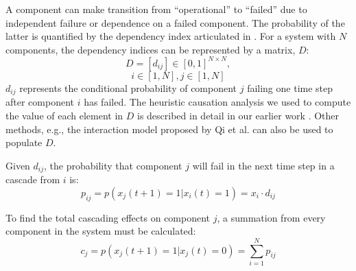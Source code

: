 \documentclass[runningheads]{llncs}
\begin{document}
A component can make transition from ``operational''  to  ``failed'' due to independent failure or dependence on a failed component. The probability of the latter is quantified by the dependency index articulated in \cite{marashi_identification_2021}. For a system with $N$ components, the dependency indices can be represented by a matrix, $D$:
\begin{equation}
D=[d_{ij} ] \in [0,1]^{N \times N},  
\end{equation}
$$i \in [1, N], j \in [1, N]$$
$d_{ij}$ represents the conditional probability of component $j$ failing one time step after component $i$ has failed. The heuristic causation analysis we used to compute the value of each element in $D$ is described in detail in our earlier work \cite{marashi_identification_2021}. Other methods, e.g., the interaction model proposed by Qi et al. \cite{qi_interaction_2015} can also be used to populate $D$.




Given $d_{ij}$, the probability that component $j$ will fail in the next time step in a cascade from $i$ is:
\begin{equation}
p_{ij} = p(x_j(t+1) = 1 | x_i(t) = 1) = x_i \cdot d_{ij}
\end{equation}

To find the total cascading effects on component $j$, a summation from every component in the system must be calculated:
\begin{equation}
c_j= p(x_j(t+1) = 1 | x_j(t) =0) = \sum_{i=1}^{N} p_{ij}
    \label{eq:P}
\end{equation}
\end{document}
